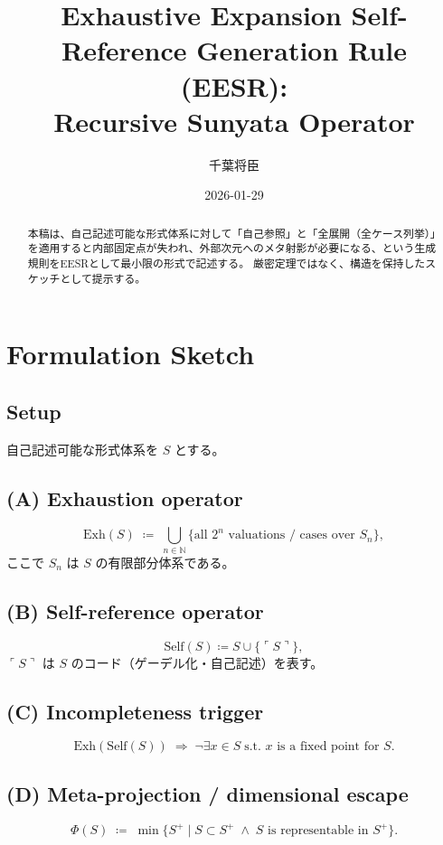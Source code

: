 \documentclass[uplatex,dvipdfmx,12pt,a4paper]{jsarticle}
\title{Exhaustive Expansion Self-Reference Generation Rule (EESR):\\
Recursive Sunyata Operator}
\author{千葉将臣}
\date{2026-01-29}
\begin{document}
\maketitle

\begin{abstract}
本稿は、自己記述可能な形式体系に対して「自己参照」と「全展開（全ケース列挙）」を適用すると内部固定点が失われ、外部次元へのメタ射影が必要になる、という生成規則をEESRとして最小限の形式で記述する。
厳密定理ではなく、構造を保持したスケッチとして提示する。
\end{abstract}

\section{Formulation Sketch}

\subsection{Setup}
自己記述可能な形式体系を $S$ とする。

\subsection{(A) Exhaustion operator}
\begin{equation}
  \mathrm{Exh}(S)
  \;\coloneqq\;
  \bigcup_{n \in \mathbb{N}} \{\text{all } 2^n \text{ valuations / cases over } S_n\},
\end{equation}
ここで $S_n$ は $S$ の有限部分体系である。

\subsection{(B) Self-reference operator}
\begin{equation}
  \mathrm{Self}(S) \coloneqq S \cup \{\ulcorner S \urcorner\},
\end{equation}
$\ulcorner S\urcorner$ は $S$ のコード（ゲーデル化・自己記述）を表す。

\subsection{(C) Incompleteness trigger}
\begin{equation}
  \mathrm{Exh}(\mathrm{Self}(S))
  \;\Rightarrow\;
  \neg\exists x\in S\;\text{s.t. } x\text{ is a fixed point for } S.
\end{equation}

\subsection{(D) Meta-projection / dimensional escape}
\begin{equation}
  \Phi(S)
  \;\coloneqq\;
  \min\{S^+ \mid S\subset S^+\;\wedge\; S\text{ is representable in } S^+\}.
\end{equation}
\end{document}

